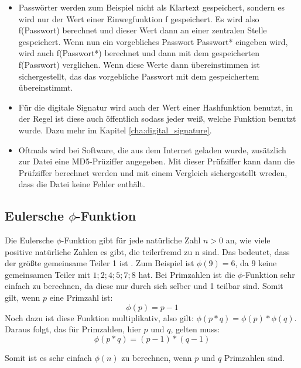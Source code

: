 \documentclass[12pt,a4paper]{scrartcl}
\begin{document}
	\begin{itemize}
	\item Passwörter werden zum Beispiel nicht als Klartext gespeichert, sondern es wird nur der Wert einer Einwegfunktion f gespeichert. Es wird also f(Passwort) berechnet und dieser Wert dann an einer zentralen Stelle gespeichert. Wenn nun ein vorgebliches Passwort Passwort* eingeben wird, wird auch f(Passwort*) berechnet und dann mit dem gespeicherten f(Passwort) verglichen. Wenn diese Werte dann übereinstimmen ist sichergestellt, das das vorgebliche Passwort mit dem gespeichertem übereinstimmt. \cite[S.22]{Beutelspacher2015-jl}
	
	\item Für die digitale Signatur wird auch der Wert einer Hashfunktion benutzt, in der Regel ist diese auch öffentlich sodass jeder weiß, welche Funktion benutzt wurde. Dazu mehr im Kapitel \ref{cha:digital_signature}. \cite[S.16]{Beutelspacher2015-jl}
	
	\item Oftmals wird bei Software, die aus dem Internet geladen wurde, zusätzlich zur Datei eine MD5-Prüziffer angegeben. Mit dieser Prüfziffer kann dann die Prüfziffer berechnet werden und mit einem Vergleich sichergestellt wreden, dass die Datei keine Fehler enthält. \cite[S.81]{teschl2008mathematik}
	\end{itemize}
	
	\label{ch:einweg}
	\subsection{Eulersche $\phi$-Funktion}
	\label{cha:phi}
	
	Die Eulersche $\phi$-Funktion gibt für jede natürliche Zahl ${n > 0}$ an, wie viele positive natürliche Zahlen es gibt, die teilerfremd zu n sind. Das bedeutet, dass der größte gemeinsame Teiler 1 ist \cite[S.106]{teschl2008mathematik}. Zum Beispiel ist ${\phi(9) = 6}$, da ${9}$ keine gemeinsamen Teiler mit ${1; 2; 4; 5; 7; 8}$ hat. Bei Primzahlen ist die $\phi$-Funktion sehr einfach zu berechnen, da diese nur durch sich selber und 1 teilbar sind. Somit gilt, wenn $p$ eine Primzahl ist: $${\phi(p) = p - 1}$$
	Noch dazu ist diese Funktion multiplikativ, also gilt: ${\phi(p * q) = \phi(p) * \phi(q)}$.
	Daraus folgt, das für Primzahlen, hier $p$ und $q$, gelten muss:
	$${\phi(p * q) = (p - 1) * (q - 1)}$$
	
	Somit ist es sehr einfach $\phi(n)$ zu berechnen, wenn $p$ und $q$ Primzahlen sind.
		
\end{document}
